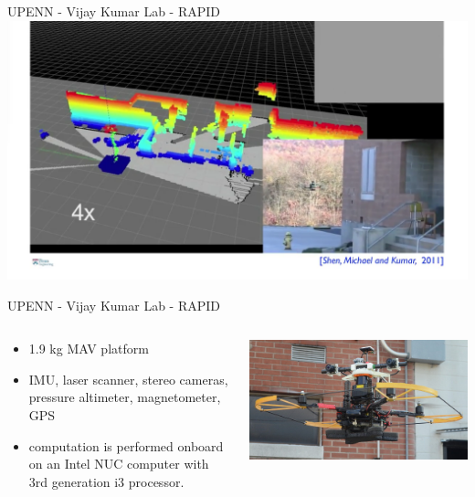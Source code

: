 \documentclass[aspectratio=169]{beamer}
\begin{document}
\begin{frame}{UPENN - Vijay Kumar Lab - RAPID}
	\centering
            \href{run:./videos/kumar_lab.mp4?autostart}
            {\includegraphics[width=.95\linewidth]{images/kumar_lab.png}}
\end{frame}

\begin{frame}{UPENN - Vijay Kumar Lab - RAPID}
	\begin{columns}
	
	\begin{column}{.49\textwidth}
	\begin{itemize}
		\item 1.9 kg MAV platform 
		\item IMU, laser scanner, stereo cameras, pressure altimeter, magnetometer, GPS 
		\item computation is performed onboard on an Intel NUC computer with 3rd generation i3 processor.
	\end{itemize}
	
	\end{column}
	\begin{column}{.49\textwidth}
	\includegraphics[width=\textwidth]{images/kumar_lab.jpg}
	\end{column}
	\end{columns}	
	\vspace{15mm}
	\color{gray}{https://www.kumarrobotics.org/videos/rapid/}
\end{frame}
\end{document}
